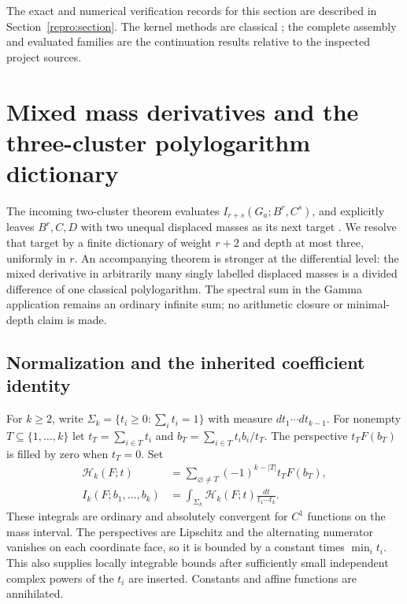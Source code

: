 \documentclass[11pt,a4paper]{article}
\theoremstyle{definition}
\theoremstyle{remark}
\numberwithin{equation}{section}
\begin{document}
The exact and numerical verification records for this section are
described in Section~\ref{repro:section}. The kernel methods are
classical \cite{DeBoor,Lesch,TicaGalapon,VillanuevaGalapon};
the complete assembly and evaluated families are the continuation
results relative to the inspected project sources.


\section{Mixed mass derivatives and the three-cluster polylogarithm dictionary}
\label{tri:sec:main}

The incoming two-cluster theorem evaluates
$I_{r+s}(G_a;B^r,C^s)$, and explicitly leaves $B^r,C,D$ with two
unequal displaced masses as its next target \cite{GammaColored}. We resolve that target
by a finite dictionary of weight $r+2$ and depth at most three,
uniformly in $r$. An accompanying theorem is stronger at the
differential level: the mixed derivative in arbitrarily many singly
labelled displaced masses is a divided difference of one classical
polylogarithm. The spectral sum in the Gamma application remains an
ordinary infinite sum; no arithmetic closure or minimal-depth claim
is made.

\subsection{Normalization and the inherited coefficient identity}

For $k\ge2$, write $\Sigma_k=\{t_i\ge0:\sum_i t_i=1\}$ with
measure $dt_1\cdots dt_{k-1}$. For nonempty $T\subseteq\{1,\ldots,k\}$
let $t_T=\sum_{i\in T}t_i$ and
$b_T=\sum_{i\in T}t_i b_i/t_T$. The perspective $t_TF(b_T)$ is
filled by zero when $t_T=0$. Set
\begin{align}
 \mathcal H_k(F;t)&=\sum_{\varnothing\ne T}
                (-1)^{k-|T|}t_TF(b_T),\label{tri:eq:H}\\
 I_k(F;b_1,\ldots,b_k)&=\int_{\Sigma_k}
                   \mathcal H_k(F;t)\frac{dt}{t_1\cdots t_k}.
                   \label{tri:eq:I}
\end{align}
These integrals are ordinary and absolutely convergent for $C^1$
functions on the mass interval. The perspectives are Lipschitz and
the alternating numerator vanishes on each coordinate face, so it
is bounded by a constant times $\min_i t_i$. This also supplies
locally integrable bounds after sufficiently small independent
complex powers of the $t_i$ are inserted. Constants and affine
functions are annihilated.
\end{document}
